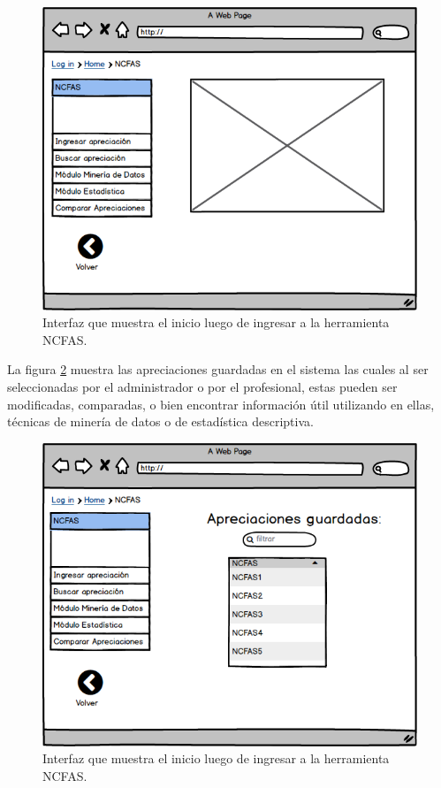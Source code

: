 \begin{figure}[htb]
	\label{inicioncfas}
	\begin{center}
		\includegraphics[scale=0.5]{imagenes/inicioncfas.png}
	\end{center}
	\caption{Interfaz que muestra el inicio luego de ingresar a la herramienta NCFAS.}
\end{figure}

\clearpage
\newpage

La figura \ref{ncfasguardados} muestra las apreciaciones guardadas en el sistema las cuales al ser seleccionadas por el administrador o por el profesional, estas pueden ser modificadas, comparadas, o bien encontrar información útil utilizando en ellas, técnicas de minería de datos o de estadística descriptiva.\\

\begin{figure}[htb]
	\label{ncfasguardados}
	\begin{center}
		\includegraphics[scale=0.5]{imagenes/ncfasguardados.png}
	\end{center}
	\caption{Interfaz que muestra el inicio luego de ingresar a la herramienta NCFAS.}
\end{figure}

